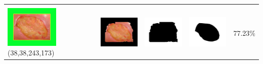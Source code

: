\begin{table}[H]
\begin{tabular}{|m{1.0in}|m{1.0in}|m{1.0in}|m{1.0in}|m{0.6in}|}
		&  &  & \\
		\includegraphics[width=1.0in]{gambar/hasil_segmentasi/luka_kuning/image_16_rect.jpg} {\centering\fontsize{10}{10}\selectfont(38,38,243,173)}&
		\includegraphics[width=1.0in]{gambar/hasil_segmentasi/luka_kuning/result_16.jpg}&
		\includegraphics[width=1.0in]{gambar/hasil_segmentasi/luka_kuning/mask_r_16.jpg}&
		\includegraphics[width=1.0in]{gambar/hasil_segmentasi/luka_kuning/16_r.jpg}&
		77.23\% \\
		\hline
	\end{tabular}
\end{table}

